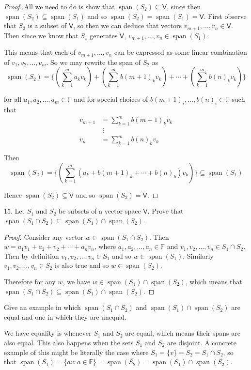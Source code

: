 \documentclass[11pt]{article}
\newcommand{\br}[1]{\left(#1\right)}
\newcommand{\cbr}[1]{\{#1\}}
\DeclareMathOperator{\Span}{span}
\begin{document}
\begin{proof}
    All we need to do is show that $\Span(S_2) \subseteq \mathsf{V}$, since then $\Span(S_2) \subseteq \Span(S_1)$ and so $\Span(S_2) = \Span(S_1) = \mathsf{V}$. First observe that $S_2$ is a subset of $\mathsf{V}$, so then we can deduce that vectors $v_{m+1},\dots,v_n\in\mathsf{V}$. Then since we know that $S_1$ generates $\mathsf{V}$, $v_{m+1},\dots,v_n\in \Span(S_1)$.
    
    This means that each of $v_{m+1},\dots,v_n$ can be expressed as some linear combination of $v_1,v_2,\dots,v_m$. So we may rewrite the span of $S_2$ as
    $$\Span\br{S_2} = \cbr{\br{\sum_{k=1}^m a_kv_k} +\br{\sum_{k=1}^m b(m+1)_{k}v_k} + \cdots + \br{\sum_{k=1}^m b(n)_{k}v_k}}$$

    for all $a_1,a_2,\dots,a_m \in \mathbb{F}$ and for special choices of $b(m+1)_i,\dots,b(n)_i\in \mathbb{F}$ such that 
    \begin{align*}
        v_{m+1} &= \sum_{k=1}^m b(m+1)_{k}v_k \\
        &~\vdots \\
        v_{n} &= \sum_{k=1}^m b(n)_{k}v_k
    \end{align*}

    Then $$\Span\br{S_2} = \cbr{\br{\sum_{k=1}^m \br{a_k+b(m+1)_k+\cdots+b(n)_k}v_k}} \subseteq \Span\br{S_1}$$

    Hence $\Span\br{S_2} \subseteq \mathsf{V}$ and so $\Span\br{S_2} = \mathsf{V}$.
\end{proof}

15. Let $S_1$ and $S_2$ be subsets of a vector space $\mathsf{V}$. Prove that $\Span\br{S_1\cap S_2}\subseteq \Span(S_1)\cap\Span(S_2)$.
\begin{proof}
    Consider any vector $w\in \Span\br{S_1\cap S_2}$. Then $w = a_1v_1 + a_2+v_2 + \cdots + a_nv_n$, where $a_1,a_2,\dots,a_n\in\mathbb{F}$ and $v_1,v_2,\dots,v_n\in S_1\cap S_2$. Then by definition $v_1,v_2,\dots,v_n\in S_1$ and so $w\in \Span\br{S_1}$. Similarly $v_1,v_2,\dots,v_n\in S_2$ is also true and so $w\in \Span\br{S_2}$.

    Therefore for any $w$, we have $w\in \Span(S_1)\cap\Span(S_2)$, which means that $\Span\br{S_1\cap S_2}\subseteq \Span(S_1)\cap\Span(S_2)$.
\end{proof}

Give an example in which $\Span\br{S_1\cap S_2}$ and $\Span(S_1)\cap\Span(S_2)$ are equal and one in which they are unequal.

We have equality is whenever $S_1$ and $S_2$ are equal, which means their spans are also equal. This also happens when the sets $S_1$ and $S_2$ are disjoint. A concrete example of this might be literally the case where $S_1 = \cbr{v} = S_2 = S_1\cap S_2$, so that $\Span(S_1) = \cbr{av : a\in\mathbb{F}} = \Span(S_2) = \Span(S_1)\cap \Span(S_2)$.
\end{document}
